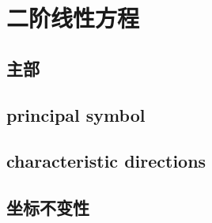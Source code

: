 \section{二阶线性方程}
\label{b2:sec:0801}


\subsection{主部}
\label{b2:subsec:080101}

\subsection{principal symbol}
\label{b2:subsec:080102}

\subsection{characteristic directions}
\label{b2:subsec:080103}

\subsection{坐标不变性}
\label{b2:subsec:080104}



